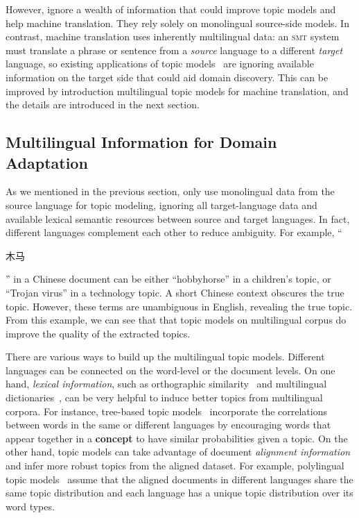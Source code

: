 However, \citet{Eidelman-12,su-12,hasler-12} ignore a wealth of information that could improve topic models and help machine translation. They rely solely on monolingual source-side models. In contrast, machine translation uses inherently multilingual data: an \textsc{smt} system must translate a phrase or sentence from a \emph{source} language to a different \emph{target} language, so existing applications of topic models~\citep{Eidelman-12,su-12,hasler-12} are ignoring available information on the target side that could aid domain discovery. This can be improved by introduction multilingual topic models for machine translation, and the details are introduced in the next section.

\subsection{Multilingual Information for Domain Adaptation}
\label{sec:trans-multiling}

As we mentioned in the previous section, \citet{Eidelman-12,su-12,hasler-12} only use monolingual data from the source language for topic modeling, ignoring all target-language data and available lexical semantic resources between source and target languages. In fact, different languages complement each other to reduce ambiguity.  For example, ``\begin{CJK*}{UTF8}{gbsn}木马\end{CJK*}'' in a Chinese document can be either ``hobbyhorse'' in a children's topic, or ``Trojan virus'' in a technology topic.  A short Chinese context obscures the true topic. However, these terms are unambiguous in English, revealing the true topic. From this example, we can see that that topic models on multilingual corpus do improve the quality of the extracted topics.

There are various ways to build up the multilingual topic models. Different languages can be connected on the word-level or the document levels. 
On one hand, \emph{lexical information}, such as orthographic similarity~\citep{boyd-graber-09} and multilingual dictionaries~\citep{boyd-graber-10}, can be very helpful to induce better topics from multilingual corpora. For instance, tree-based topic models~\citep{boyd-graber-07,andrzejewski-09,Hu:Boyd-Graber:Satinoff-ur} incorporate the correlations between words in the same or different languages by encouraging words that appear together in a {\bf concept} to have similar probabilities given a topic. 
On the other hand, topic models can take advantage of document \emph{alignment information} and infer more robust topics from the aligned dataset. For example, polylingual topic models~\citep{mimno-09} assume that the aligned documents in different languages share the same topic distribution and each language has a unique topic distribution over its word types. 

